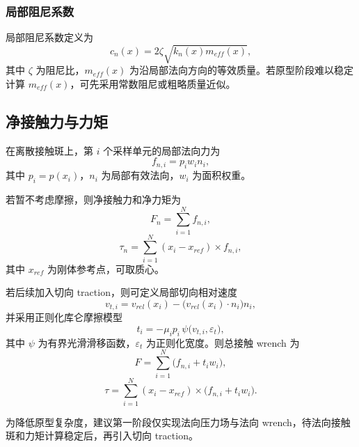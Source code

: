 \subsubsection{局部阻尼系数}
局部阻尼系数定义为
\begin{equation}
c_n(x)=2\zeta\sqrt{k_n(x)m_{eff}(x)},
\end{equation}
其中 $\zeta$ 为阻尼比，$m_{eff}(x)$ 为沿局部法向方向的等效质量。若原型阶段难以稳定计算 $m_{eff}(x)$，可先采用常数阻尼或粗略质量近似。

\subsection{净接触力与力矩}
在离散接触斑上，第 $i$ 个采样单元的局部法向力为
\begin{equation}
f_{n,i}=p_i w_i n_i,
\end{equation}
其中 $p_i=p(x_i)$，$n_i$ 为局部有效法向，$w_i$ 为面积权重。

若暂不考虑摩擦，则净接触力和净力矩为
\begin{equation}
F_n=\sum_{i=1}^{N} f_{n,i},
\end{equation}
\begin{equation}
\tau_n=\sum_{i=1}^{N} (x_i-x_{ref})\times f_{n,i},
\end{equation}
其中 $x_{ref}$ 为刚体参考点，可取质心。

若后续加入切向 traction，则可定义局部切向相对速度
\begin{equation}
v_{t,i}=v_{rel}(x_i)-\bigl(v_{rel}(x_i)\cdot n_i\bigr)n_i,
\end{equation}
并采用正则化库仑摩擦模型
\begin{equation}
t_i=-\mu_i p_i\,\psi\bigl(v_{t,i},\varepsilon_t\bigr),
\end{equation}
其中 $\psi$ 为有界光滑滑移函数，$\varepsilon_t$ 为正则化宽度。则总接触 wrench 为
\begin{equation}
F=\sum_{i=1}^{N}\bigl(f_{n,i}+t_i w_i\bigr),
\end{equation}
\begin{equation}
\tau=\sum_{i=1}^{N}(x_i-x_{ref})\times\bigl(f_{n,i}+t_i w_i\bigr).
\end{equation}

为降低原型复杂度，建议第一阶段仅实现法向压力场与法向 wrench，待法向接触斑和力矩计算稳定后，再引入切向 traction。


